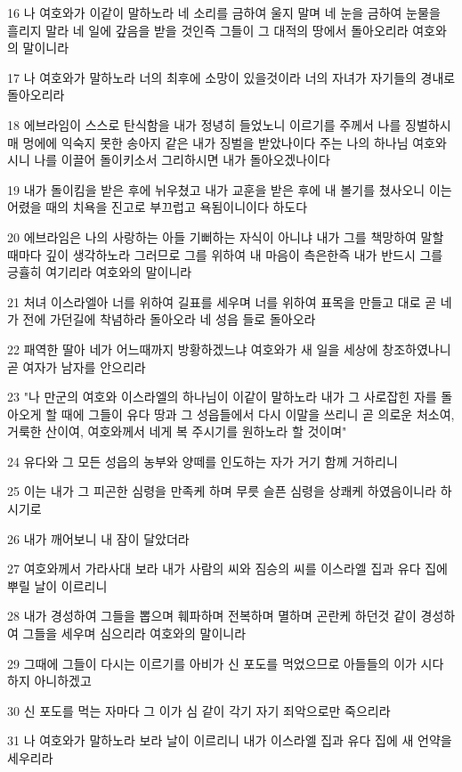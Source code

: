 \par 16 나 여호와가 이같이 말하노라 네 소리를 금하여 울지 말며 네 눈을 금하여 눈물을 흘리지 말라 네 일에 갚음을 받을 것인즉 그들이 그 대적의 땅에서 돌아오리라 여호와의 말이니라
\par 17 나 여호와가 말하노라 너의 최후에 소망이 있을것이라 너의 자녀가 자기들의 경내로 돌아오리라
\par 18 에브라임이 스스로 탄식함을 내가 정녕히 들었노니 이르기를 주께서 나를 징벌하시매 멍에에 익숙지 못한 송아지 같은 내가 징벌을 받았나이다 주는 나의 하나님 여호와시니 나를 이끌어 돌이키소서 그리하시면 내가 돌아오겠나이다
\par 19 내가 돌이킴을 받은 후에 뉘우쳤고 내가 교훈을 받은 후에 내 볼기를 쳤사오니 이는 어렸을 때의 치욕을 진고로 부끄럽고 욕됨이니이다 하도다
\par 20 에브라임은 나의 사랑하는 아들 기뻐하는 자식이 아니냐 내가 그를 책망하여 말할 때마다 깊이 생각하노라 그러므로 그를 위하여 내 마음이 측은한즉 내가 반드시 그를 긍휼히 여기리라 여호와의 말이니라
\par 21 처녀 이스라엘아 너를 위하여 길표를 세우며 너를 위하여 표목을 만들고 대로 곧 네가 전에 가던길에 착념하라 돌아오라 네 성읍 들로 돌아오라
\par 22 패역한 딸아 네가 어느때까지 방황하겠느냐 여호와가 새 일을 세상에 창조하였나니 곧 여자가 남자를 안으리라
\par 23 "나 만군의 여호와 이스라엘의 하나님이 이같이 말하노라 내가 그 사로잡힌 자를 돌아오게 할 때에 그들이 유다 땅과 그 성읍들에서 다시 이말을 쓰리니 곧 의로운 처소여, 거룩한 산이여, 여호와께서 네게 복 주시기를 원하노라 할 것이며"
\par 24 유다와 그 모든 성읍의 농부와 양떼를 인도하는 자가 거기 함께 거하리니
\par 25 이는 내가 그 피곤한 심령을 만족케 하며 무릇 슬픈 심령을 상쾌케 하였음이니라 하시기로
\par 26 내가 깨어보니 내 잠이 달았더라
\par 27 여호와께서 가라사대 보라 내가 사람의 씨와 짐승의 씨를 이스라엘 집과 유다 집에 뿌릴 날이 이르리니
\par 28 내가 경성하여 그들을 뽑으며 훼파하며 전복하며 멸하며 곤란케 하던것 같이 경성하여 그들을 세우며 심으리라 여호와의 말이니라
\par 29 그때에 그들이 다시는 이르기를 아비가 신 포도를 먹었으므로 아들들의 이가 시다 하지 아니하겠고
\par 30 신 포도를 먹는 자마다 그 이가 심 같이 각기 자기 죄악으로만 죽으리라
\par 31 나 여호와가 말하노라 보라 날이 이르리니 내가 이스라엘 집과 유다 집에 새 언약을 세우리라
